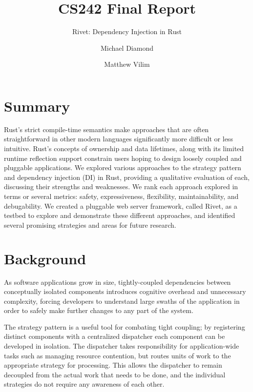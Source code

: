 \documentclass[sigconf]{acmart}
\begin{document}
\title{CS242 Final Report}
\subtitle{Rivet: Dependency Injection in Rust}

\author{Michael Diamond}
\affiliation{}

\author{Matthew Vilim}
\affiliation{}

\maketitle

\section{Summary}

Rust's strict compile-time semantics make approaches that are often straightforward in other modern languages significantly more difficult or less intuitive. Rust's concepts of ownership and data lifetimes, along with its limited runtime reflection support constrain users hoping to design loosely coupled and pluggable applications. We explored various approaches to the strategy pattern\cite{wiki:strategy-pattern} and dependency injection\cite{wiki:di} (DI) in Rust, providing a qualitative evaluation of each, discussing their strengths and weaknesses. We rank each approach explored in terms or several metrics: safety, expressiveness, flexibility, maintainability, and debugability. We created a pluggable web server framework, called Rivet, as a testbed to explore and demonstrate these different approaches, and identified several promising strategies and areas for future research.

\section{Background}

As software applications grow in size, tightly-coupled dependencies between conceptually isolated components introduces cognitive overhead and unnecessary complexity, forcing developers to understand large swaths of the application in order to safely make further changes to any part of the system.

The strategy pattern is a useful tool for combating tight coupling; by registering distinct components with a centralized dispatcher each component can be developed in isolation. The dispatcher takes responsibility for application-wide tasks such as managing resource contention, but routes units of work to the appropriate strategy for processing. This allows the dispatcher to remain decoupled from the actual work that needs to be done, and the individual strategies do not require any awareness of each other.
\end{document}
